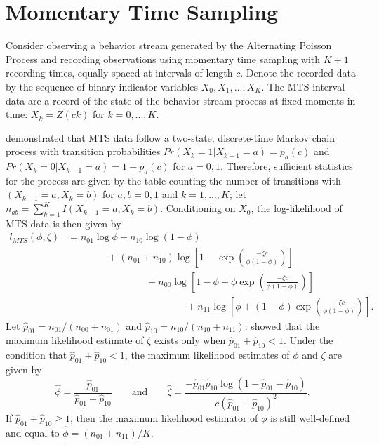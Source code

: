 \documentclass[man, noextraspace, floatsintext]{apa6}\usepackage[]{graphicx}\usepackage[]{color}
\begin{document}
\section{Momentary Time Sampling}
\label{sec:MTS}

Consider observing a behavior stream generated by the Alternating Poisson Process and recording observations using momentary time sampling with $K + 1$ recording times, equally spaced at intervals of length $c$. Denote the recorded data by the sequence of binary indicator variables $X_0,X_1,...,X_K$. The MTS interval data are a record of the state of the behavior stream process at fixed moments in time: $X_k = Z(ck)$ for $k = 0,...,K$. 

\citet{Brown1977estimation} demonstrated that MTS data follow a two-state, discrete-time Markov chain process with transition probabilities $Pr(X_k = 1 | X_{k-1} = a) = p_a(c)$ and $Pr(X_k = 0 | X_{k-1} = a) = 1 - p_a(c)$ for $a = 0,1$. Therefore, sufficient statistics for the process are given by the table counting the number of transitions with $(X_{k-1} = a, X_k = b)$ for $a,b = 0,1$ and $k = 1,...,K$; let $n_{ab} = \sum_{k=1}^K I(X_{k-1} = a, X_k = b)$. Conditioning on $X_0$, the log-likelihood of MTS data is then given by \begin{equation}
\begin{aligned}
\label{eq:MTS_loglik}
l_{MTS}(\phi, \zeta) &= n_{01} \log \phi + n_{10} \log\left(1 - \phi\right) \\
& \qquad \qquad + \left(n_{01} + n_{10}\right) \log \left[1 - \exp\left(\frac{-\zeta c}{\phi (1 - \phi)}\right)\right] \\
& \qquad \qquad \qquad \qquad + n_{00} \log\left[1 - \phi + \phi \exp\left(\frac{-\zeta c}{\phi (1 - \phi)}\right)\right]\\
& \qquad \qquad \qquad \qquad \qquad \qquad + n_{11}\log\left[\phi + \left(1 - \phi\right)\exp\left(\frac{-\zeta c}{\phi (1 - \phi)}\right)\right].
\end{aligned}
\end{equation}
Let $\hat{p}_{01} = n_{01}/ \left(n_{00} + n_{01}\right)$ and $\hat{p}_{10} = n_{10} / \left(n_{10} + n_{11}\right)$. \citet{Brown1977estimation} showed that the maximum likelihood estimate of $\zeta$ exists only when $\hat{p}_{01} + \hat{p}_{10} < 1$. Under the condition that $\hat{p}_{01} + \hat{p}_{10} < 1$, the maximum likelihood estimates of $\phi$ and $\zeta$ are given by 
\begin{equation}
\label{eq:MTS_mle}
\hat\phi = \frac{\hat{p}_{01}}{\hat{p}_{01} + \hat{p}_{10}} \qquad \text{and} \qquad
\hat\zeta = \frac{-\hat{p}_{01} \hat{p}_{10} \log(1 - \hat{p}_{01} - \hat{p}_{10})}{c \left(\hat{p}_{01} + \hat{p}_{10}\right)^2}.
\end{equation}
If $\hat{p}_{01} + \hat{p}_{10} \geq 1$, then the maximum likelihood estimator of $\phi$ is still well-defined and equal to $\hat\phi = \left(n_{01} + n_{11}\right) / K$. 
\end{document}

